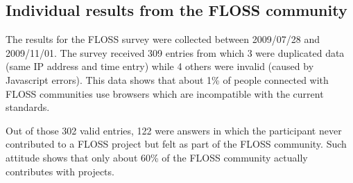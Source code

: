 \documentclass[lnbip]{svmultln}
\begin{document}
\subsection{Individual results from the FLOSS community}
\label{subsec:floss-results}

The results for the FLOSS survey were collected between 2009/07/28 and
2009/11/01. The survey received 309 entries from which 3 were
duplicated data (same IP address and time entry) while 4 others were
invalid (caused by Javascript errors). This data shows that about 1\%
of people connected with FLOSS communities use browsers which are
incompatible with the current standards.

Out of those 302 valid entries, 122 were answers in which the
participant never contributed to a FLOSS project but felt as part of
the FLOSS community. Such attitude shows that only about 60\% of the
FLOSS community actually contributes with projects.
\end{document}
